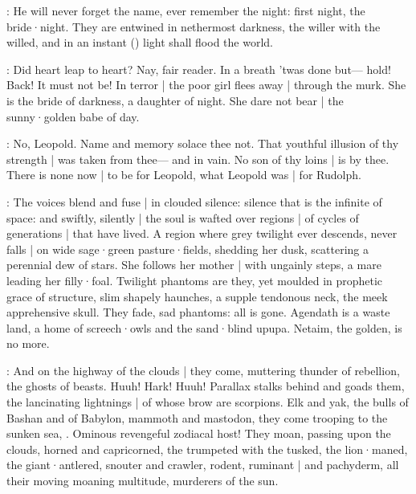 :
He will never forget the name,
ever remember the night:
first night,
the bride·night.
They are entwined in nethermost darkness,
the willer with the willed,
and in an instant
()
light shall flood the world.

:
Did heart leap to heart?
Nay,
fair reader.
In a breath 'twas
done but---%
hold!
Back!
It must not be!
In terror |
the poor girl flees away |
through the murk.
She is the bride of darkness,
a daughter of night.
She dare not bear |
the sunny·golden babe of day.

:
No,
Leopold.
Name and memory solace thee not.
That youthful illusion of thy strength |
was taken from thee---%
and in vain.
No son of thy loins |
is by thee.
There is none now |
to be for Leopold,
what Leopold was |
for Rudolph.

\begin{omitted}



:
The voices blend and fuse |
in clouded silence:
silence that is the infinite of space:
and swiftly,
silently |
the soul is wafted over regions |
of cycles of generations |
that have lived.
A region where grey twilight ever descends,
never falls |
on wide sage·green pasture·fields,
shedding her dusk,
scattering a perennial dew of stars.
She follows her mother |
with ungainly steps,
a mare leading her filly·foal.
Twilight phantoms are they,
yet moulded in prophetic grace of structure,
slim shapely haunches,
a supple tendonous neck,
the meek apprehensive skull.
They fade,
sad phantoms:
all is gone.
Agendath is a waste land,
a home of screech·owls and the sand·blind upupa.
Netaim,
the golden,
is no more.

:
And on the highway of the clouds |
they come,
muttering thunder of rebellion,
the ghosts of beasts.
Huuh!
Hark!
Huuh!
Parallax stalks behind and goads them,
the lancinating lightnings |
of whose brow are scorpions.
Elk and yak,
the bulls of Bashan and of Babylon,
mammoth and mastodon,
they come trooping to the sunken sea,
.
Ominous revengeful zodiacal host!
They moan,
passing upon the clouds,
horned and capricorned,
the trumpeted with the tusked,
the lion·maned,
the giant·antlered,
snouter and crawler,
rodent,
ruminant |
and pachyderm,
all their moving moaning multitude,
murderers of the sun.



\end{omitted}
